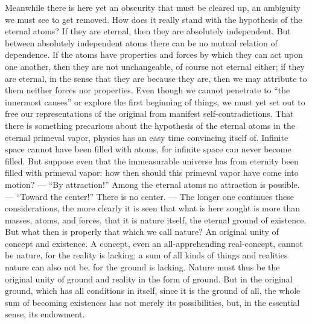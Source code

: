 \documentclass[12pt]{book}
\begin{document}
Meanwhile there is here yet an obscurity that must be cleared up, an ambiguity we must see
to get removed. How does it really stand with the hypothesis of the eternal atoms? If they
are eternal, then they are absolutely independent. But between absolutely independent atoms
there can be no mutual relation of dependence. If the atoms have properties and forces by
which they can act upon one another, then they are not unchangeable, of course not eternal
either; if they are eternal, in the sense that they are because they are, then we may
attribute to them neither forces nor properties. Even though we cannot penetrate to ``the
innermost causes'' or explore the first beginning of things, we must yet set out to free
our representations of the original from manifest self-contradictions. That there is
something precarious about the hypothesis of the eternal atoms in the eternal primeval vapor,
physics has an easy time convincing itself of. Infinite space cannot have been filled with
atoms, for infinite space can never become filled. But suppose even that the immeasurable
universe has from eternity been filled with primeval vapor: how then should this primeval
vapor have come into motion? --- ``By attraction!'' Among the eternal atoms no attraction is
possible. --- ``Toward the center!'' There is no center. --- The longer one continues these
considerations, the more clearly it is seen that what is here sought is more than masses,
atoms, and forces, that it is nature itself, the eternal ground of existence. But what then
is properly that which we call nature? An original unity of concept and existence. A concept,
even an all-apprehending real-concept, cannot be nature, for the reality is lacking; a sum of
all kinds of things and realities nature can also not be, for the ground is lacking. Nature
must thus be the original unity of ground and reality in the form of ground. But in the
original ground, which has all conditions in itself, since it is the ground of all, the whole
sum of becoming existences has not merely its possibilities, but, in the essential sense, its
endowment.
\end{document}

